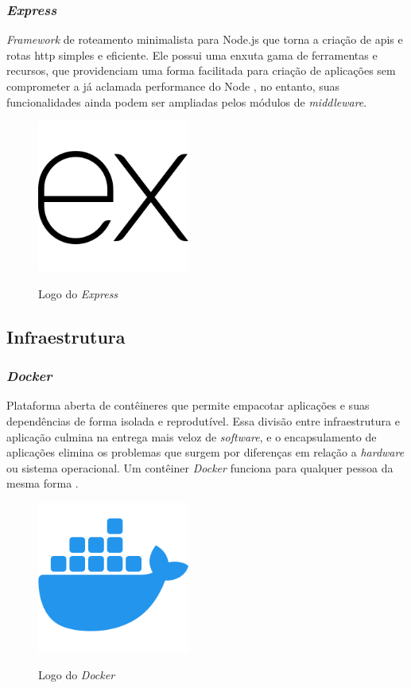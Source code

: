 \subsubsection{\emph{Express}} 
\emph{Framework} de roteamento minimalista para Node.js que torna a criação de \gls{api}s e rotas \gls{http} simples e eficiente. Ele possui uma enxuta gama de ferramentas e recursos, que providenciam uma forma facilitada para criação de aplicações sem comprometer a já aclamada performance do Node \cite{express}, no entanto, suas funcionalidades ainda podem ser ampliadas pelos módulos de \emph{middleware}.

\begin{figure}[htb]
	\centering
	\caption{Logo do \emph{Express}}
	\includegraphics[width=5cm]{cap04-desenvolvimento/images/4-4-2-2-express-logo.png}
	\label{fig:express-logo}
\end{figure}
\FloatBarrier

\subsection{Infraestrutura} 

\subsubsection{\emph{Docker}}
Plataforma aberta de contêineres que permite empacotar aplicações e suas dependências de forma isolada e reprodutível. Essa divisão entre infraestrutura e aplicação culmina na entrega mais veloz de \emph{software}, e o encapsulamento de aplicações elimina os problemas que surgem por diferenças em relação a \emph{hardware} ou sistema operacional. Um contêiner \emph{Docker} funciona para qualquer pessoa da mesma forma \cite{docker}.

\begin{figure}[htb]
	\centering
	\caption{Logo do \emph{Docker}}
	\includegraphics[width=5cm]{cap04-desenvolvimento/images/4-4-3-1-docker-logo.png}
	\label{fig:docker-logo}
\end{figure}
\FloatBarrier

